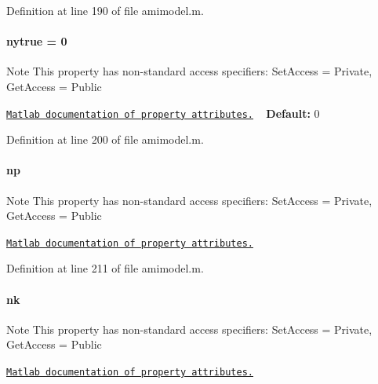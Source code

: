 Definition at line 190 of file amimodel.\+m.

\hypertarget{classamimodel_ac91d7b36031ec122abc9f739692b02e8}{}
\paragraph[{nytrue}]{\setlength{\rightskip}{0pt plus 5cm}nytrue = 0}\label{classamimodel_ac91d7b36031ec122abc9f739692b02e8}
\begin{DoxyNote}{Note}
This property has non-\/standard access specifiers\+: {\ttfamily Set\+Access = Private, Get\+Access = Public} 

\href{http://www.mathworks.com/help/matlab/matlab_oop/property-attributes.html}{\tt Matlab documentation of property attributes.} ~\newline
{\bfseries Default\+:} 0 
\end{DoxyNote}


Definition at line 200 of file amimodel.\+m.

\hypertarget{classamimodel_a6f6e2fe71b05c4c2f2d967ce9ca02dfd}{}
\paragraph[{np}]{\setlength{\rightskip}{0pt plus 5cm}np}\label{classamimodel_a6f6e2fe71b05c4c2f2d967ce9ca02dfd}
\begin{DoxyNote}{Note}
This property has non-\/standard access specifiers\+: {\ttfamily Set\+Access = Private, Get\+Access = Public} 

\href{http://www.mathworks.com/help/matlab/matlab_oop/property-attributes.html}{\tt Matlab documentation of property attributes.} 
\end{DoxyNote}


Definition at line 211 of file amimodel.\+m.

\hypertarget{classamimodel_afd6bea572754e0c3c320664bdccf0200}{}
\paragraph[{nk}]{\setlength{\rightskip}{0pt plus 5cm}nk}\label{classamimodel_afd6bea572754e0c3c320664bdccf0200}
\begin{DoxyNote}{Note}
This property has non-\/standard access specifiers\+: {\ttfamily Set\+Access = Private, Get\+Access = Public} 

\href{http://www.mathworks.com/help/matlab/matlab_oop/property-attributes.html}{\tt Matlab documentation of property attributes.} 
\end{DoxyNote}


